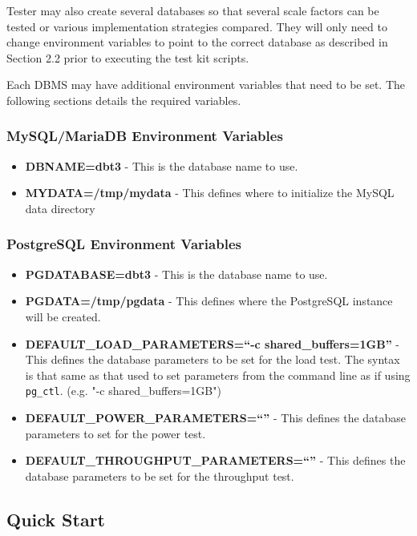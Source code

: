 \documentclass{article}
\begin{document}
Tester may also create several databases so that several scale
factors can be tested or various implementation strategies compared.
They will only need to change environment variables to point to the
correct database as described in Section 2.2 prior to executing the
test kit scripts.

Each DBMS may have additional environment variables that need to be set.  The following sections details the required variables.

\subsubsection{MySQL/MariaDB Environment Variables}

\begin{itemize}
\item \textbf{DBNAME=dbt3} - This is the database name to use.
\item \textbf{MYDATA=/tmp/mydata} - This defines where to initialize the MySQL data directory
\end{itemize}

\subsubsection{PostgreSQL Environment Variables}

\begin{itemize}
\item \textbf{PGDATABASE=dbt3} - This is the database name to use.
\item \textbf{PGDATA=/tmp/pgdata} - This defines where the PostgreSQL instance will be created.
\item \textbf{DEFAULT\_LOAD\_PARAMETERS=``-c shared\_buffers=1GB''} - This defines the database parameters to be set for the load test.  The syntax is that same as that used to set parameters from the command line as if using \texttt{pg\_ctl}. (e.g. "-c shared\_buffers=1GB")
\item \textbf{DEFAULT\_POWER\_PARAMETERS=``''} - This defines the database parameters to set for the power test.
\item \textbf{DEFAULT\_THROUGHPUT\_PARAMETERS=``''} - This defines the database parameters to be set for the throughput test.
\end{itemize}

\subsection{Quick Start}
\end{document}
